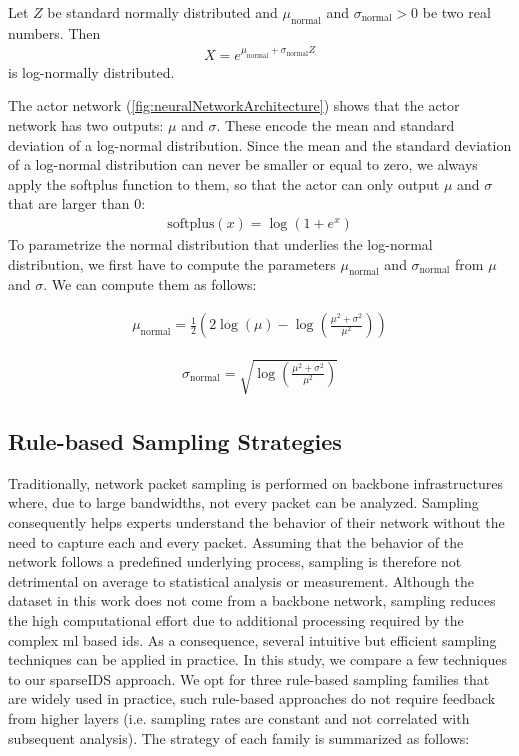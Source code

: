 \documentclass[conference]{IEEEtran}
\begin{document}
Let $Z$ be standard normally distributed and $\mu_{\text{normal}}$ and $\sigma_{\text{normal}} > 0$ be two real numbers. Then 
\begin{align}
X = e^{\mu_{\text{normal}}+\sigma_{\text{normal}} Z}
\end{align}
is log-normally distributed. 

The actor network (\autoref{fig:neuralNetworkArchitecture}) shows that the actor network has two outputs: $\mu$ and $\sigma$. These encode the mean and standard deviation of a log-normal distribution. Since the mean and the standard deviation of a log-normal distribution can never be smaller or equal to zero, we always apply the softplus function to them, so that the actor can only output $\mu$ and $\sigma$ that are larger than 0: 
\begin{align}
\text{softplus}(x) = \log\left(1 + e^x \right)
\end{align}
To parametrize the normal distribution that underlies the log-normal distribution, we first have to compute the parameters $\mu_{\text{normal}}$ and $\sigma_{\text{normal}}$ from $\mu$ and $\sigma$. We can compute them as follows: 

\begin{align}
\mu_{\text{normal}} = \frac{1}{2}\left( 2\log(\mu) - \log\left(\frac{\mu^2 + \sigma^2}{\mu^2}\right) \right)
\end{align}

\begin{align}
\sigma_{\text{normal}} = \sqrt{\log\left(\frac{\mu^2 + \sigma^2}{\mu^2}\right)}
\end{align}

\subsection{Rule-based Sampling Strategies}
Traditionally, network packet sampling is performed on backbone infrastructures where, due to large bandwidths, not every packet can be analyzed. Sampling consequently helps experts understand the behavior of their network without the need to capture each and every packet. Assuming that the behavior of the network follows a predefined underlying process, sampling is therefore not detrimental on average to statistical analysis or measurement. Although the dataset in this work does not come from a backbone network, sampling reduces the high computational effort due to additional processing  required by the complex \gls{ml} based \gls{ids}. As a consequence, several intuitive but efficient sampling techniques can be applied in practice. In this study, we compare a few techniques to our sparseIDS approach. 
We opt for three rule-based sampling families that are widely used in practice, such rule-based approaches do not require feedback from higher layers (i.e. sampling rates are constant and not correlated with subsequent analysis). The strategy of each family is summarized as follows:
\end{document}
